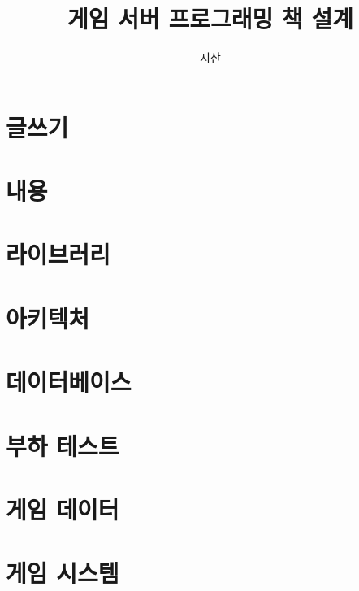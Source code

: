 \documentclass[11pt]{book}
\begin{document}
\title{게임 서버 프로그래밍 책 설계}
\author{지산}
\maketitle
\tableofcontents

\part{글쓰기}


\part{내용}


\part{라이브러리}


\part{아키텍처}


\part{데이터베이스}


\part{부하 테스트}


\part{게임 데이터}


\part{게임 시스템}

\end{document}
